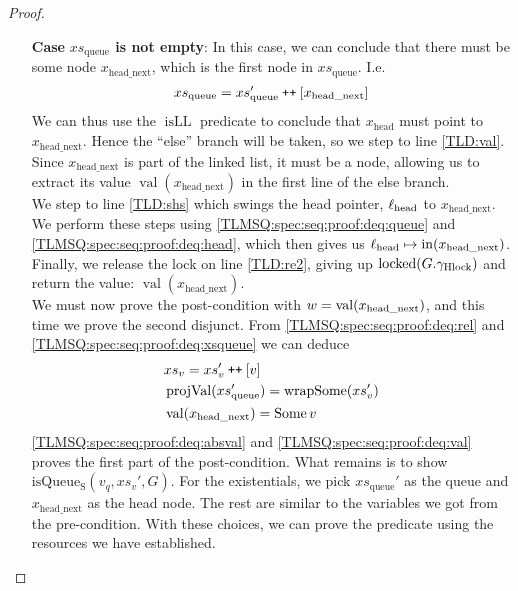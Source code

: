 \documentclass[a4paper, 10pt]{report}
\theoremstyle{definition}
\newcommand{\locked}{\operatorname{locked}}
\newcommand{\isqueueseq}{\operatorname{isQueue_{S}}}
\newcommand{\vq}{v_q}
\newcommand{\xsqueue}{xs_{\mathrm{queue}}}
\newcommand{\isLL}{\operatorname{isLL}}
\newcommand{\projval}{\operatorname{projVal}}
\newcommand{\wrapsome}{\operatorname{wrapSome}}
\newcommand{\locN}[1]{\loc_{\mathrm{#1}}}
\newcommand{\lochead}{\locN{head}}
\newcommand{\nodeval}{\valB}
\newcommand{\nIn}[1]{\operatorname{in}(#1)}
\newcommand{\nVal}[1]{\operatorname{val}(#1)}
\newcommand{\node}{x}
\newcommand{\nodeN}[1]{\node_{\mathrm{#1}}}
\newcommand{\nodehead}{\nodeN{head}}
\newcommand{\nodeheadnext}{\nodeN{head\_next}}
\newcommand{\absvalue}{\val}
\newcommand{\absvalueList}{xs_v}
\newcommand{\Qg}{G}
\newcommand{\ghlock}{\gname_{\mathrm{Hlock}}}
\newcommand\catenate{\mathbin{\text{\ttfamily\upshape ++}}}
\begin{document}
\begin{proof}
\begin{itemize}
  In this case, \ref{TLMSQ:spec:seq:proof:deq:isLL} simply asserts $\isLL [\nodehead]$, which by definition tells us that $\nodehead \mapsto \None$. Hence, the ``if'' on line \ref{TLD:ifn} will take the ``then'' branch, so we step to line \ref{TLD:re1}. Here we release the lock, giving up $\locked(\Qg.\ghlock)$, and return $\None$ on the next line. What remains is to prove the post-condition with $\nodeval = \None$. We can easily do this by proving the first disjunction. From \ref{TLMSQ:spec:seq:proof:deq:rel} with the fact that $\xsqueue = []$ we can conclude that $\absvalueList$ is empty, and since we haven't modified the queue, we can prove $\isqueueseq(\vq, \absvalueList, \Qg)$ using the same resources we got from the pre-condition.
  
  \item[\textbf{Case}] \textbf{$\xsqueue$ is not empty}: 
  In this case, we can conclude that there must be some node $\nodeheadnext$, which is the first node in $\xsqueue$. I.e.
  \begin{equation}
    \xsqueue = \xsqueue' \catenate [\nodeheadnext]\label{TLMSQ:spec:seq:proof:deq:xsqueue}
  \end{equation}
  We can thus use the $\isLL$ predicate to conclude that $\nodehead$ must point to $\nodeheadnext$. Hence the ``else'' branch will be taken, so we step to line \ref{TLD:val}. Since $\nodeheadnext$ is part of the linked list, it must be a node, allowing us to extract its value $\nVal{\nodeheadnext}$ in the first line of the else branch.\\
  We step to line \ref{TLD:shs} which swings the head pointer, $\lochead$ to $\nodeheadnext$. We perform these steps using \ref{TLMSQ:spec:seq:proof:deq:queue} and \ref{TLMSQ:spec:seq:proof:deq:head}, which then gives us $\lochead \mapsto \nIn{\nodeheadnext}$.\\
  Finally, we release the lock on line \ref{TLD:re2}, giving up $\locked(\Qg.\ghlock)$ and return the value: $\nVal{\nodeheadnext}$.\\
  We must now prove the post-condition with $\nodeval = \nVal{\nodeheadnext}$, and this time we prove the second disjunct. From \ref{TLMSQ:spec:seq:proof:deq:rel} and \ref{TLMSQ:spec:seq:proof:deq:xsqueue} we can deduce
  \begin{align}
    &\absvalueList = \absvalueList' \catenate [\absvalue]\label{TLMSQ:spec:seq:proof:deq:absval}\\
    &\projval(\xsqueue') = \wrapsome(\absvalueList')\label{TLMSQ:spec:seq:proof:deq:rel'}\\
    &\nVal{\nodeheadnext} = \Some{\absvalue}\label{TLMSQ:spec:seq:proof:deq:val}
  \end{align}
  \ref{TLMSQ:spec:seq:proof:deq:absval} and \ref{TLMSQ:spec:seq:proof:deq:val} proves the first part of the post-condition. What remains is to show $\isqueueseq(\vq, \absvalueList', \Qg)$. For the existentials, we pick $\xsqueue'$ as the queue and $\nodeheadnext$ as the head node. The rest are similar to the variables we got from the pre-condition. With these choices, we can prove the predicate using the resources we have established.
\end{itemize}
\end{proof}
\end{document}
